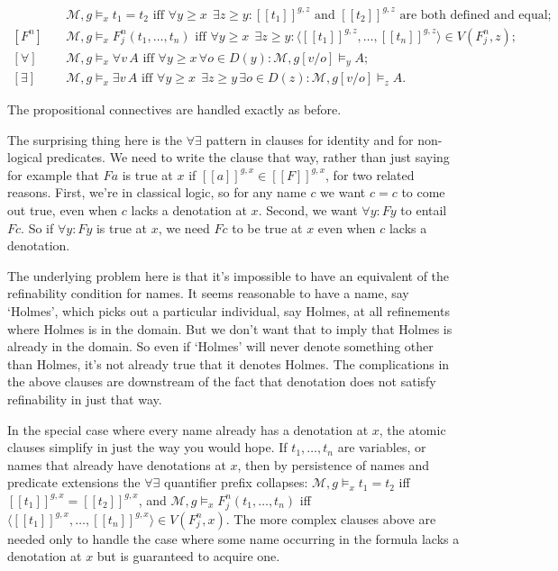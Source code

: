 \documentclass[
  10.5pt,
  twoside]{article}
\newcommand{\llbracket}{[\![}
\newcommand{\rrbracket}{]\!]}
\begin{document}
\begin{align*}
[=] \quad & \mathcal{M}, g \models_x t_1 = t_2 \text{ iff } \forall y \geqslant x \;\, \exists z \geqslant y : \llbracket t_1 \rrbracket^{g,z} \text{ and } \llbracket t_2 \rrbracket^{g,z} \text{ are both defined and equal}; \\
[F^n] \quad & \mathcal{M}, g \models_x F^n_j(t_1, \dots, t_n) \text{ iff } \forall y \geqslant x \;\, \exists z \geqslant y : \langle \llbracket t_1 \rrbracket^{g,z}, \dots, \llbracket t_n \rrbracket^{g,z} \rangle \in V(F^n_j, z); \\
[\forall] \quad & \mathcal{M}, g \models_x \forall v \, A \text{ iff } \forall y \geqslant x \, \forall o \in D(y) : \mathcal{M}, g[v/o] \models_y A; \\
[\exists] \quad & \mathcal{M}, g \models_x \exists v \, A \text{ iff } \forall y \geqslant x \;\, \exists z \geqslant y \, \exists o \in D(z) : \mathcal{M}, g[v/o] \models_z A.
\end{align*}

The propositional connectives are handled exactly as before.

The surprising thing here is the \(\forall\exists\) pattern in clauses
for identity and for non-logical predicates. We need to write the clause
that way, rather than just saying for example that \(Fa\) is true at
\(x\) if
\(\llbracket a \rrbracket^{g,x} \in \llbracket F \rrbracket^{g,x}\), for
two related reasons. First, we're in classical logic, so for any name
\(c\) we want \(c=c\) to come out true, even when \(c\) lacks a
denotation at \(x\). Second, we want \(\forall y: Fy\) to entail \(Fc\).
So if \(\forall y: Fy\) is true at \(x\), we need \(Fc\) to be true at
\(x\) even when \(c\) lacks a denotation.

The underlying problem here is that it's impossible to have an
equivalent of the refinability condition for names. It seems reasonable
to have a name, say `Holmes', which picks out a particular individual,
say Holmes, at all refinements where Holmes is in the domain. But we
don't want that to imply that Holmes is already in the domain. So even
if `Holmes' will never denote something other than Holmes, it's not
already true that it denotes Holmes. The complications in the above
clauses are downstream of the fact that denotation does not satisfy
refinability in just that way.

In the special case where every name already has a denotation at \(x\),
the atomic clauses simplify in just the way you would hope. If
\(t_1, \dots, t_n\) are variables, or names that already have
denotations at \(x\), then by persistence of names and predicate
extensions the \(\forall\exists\) quantifier prefix collapses:
\(\mathcal{M}, g \models_x t_1 = t_2\) iff
\(\llbracket t_1 \rrbracket^{g,x} = \llbracket t_2 \rrbracket^{g,x}\),
and \(\mathcal{M}, g \models_x F^n_j(t_1, \dots, t_n)\) iff
\mbox{$\langle \llbracket t_1 \rrbracket^{g,x}, \dots, \llbracket t_n \rrbracket^{g,x} \rangle \in V(F^n_j, x)$}.
The more complex clauses above are needed only to handle the case where
some name occurring in the formula lacks a denotation at \(x\) but is
guaranteed to acquire one.
\end{document}
